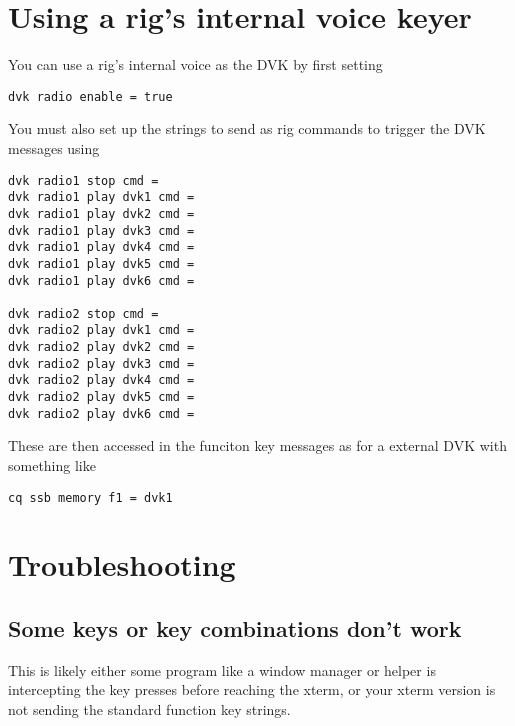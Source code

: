 \documentclass[12pt]{article}
\begin{document}
\section{Using a rig's internal voice keyer}
You can use a rig's internal voice as the DVK by first setting
\begin{verbatim}
dvk radio enable = true
\end{verbatim}
You must also set up the strings to send as
rig commands to trigger the DVK messages using
\begin{verbatim}
dvk radio1 stop cmd =
dvk radio1 play dvk1 cmd =
dvk radio1 play dvk2 cmd =
dvk radio1 play dvk3 cmd =
dvk radio1 play dvk4 cmd =
dvk radio1 play dvk5 cmd =
dvk radio1 play dvk6 cmd =

dvk radio2 stop cmd =
dvk radio2 play dvk1 cmd =
dvk radio2 play dvk2 cmd =
dvk radio2 play dvk3 cmd =
dvk radio2 play dvk4 cmd =
dvk radio2 play dvk5 cmd =
dvk radio2 play dvk6 cmd =
\end{verbatim}
These are then accessed in the funciton key messages as for a external
DVK with something like
\begin{verbatim}
cq ssb memory f1 = dvk1
\end{verbatim}

\section{Troubleshooting}
\subsection{Some keys or key combinations don't work}
This is likely either some program like a window manager or helper
is intercepting the key presses before reaching the xterm, or your xterm
version is not sending the standard function key strings.
\end{document}

